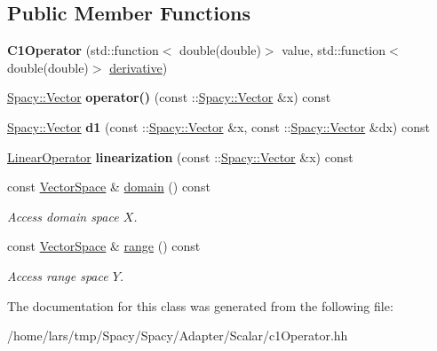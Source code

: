 \subsection*{Public Member Functions}
\begin{DoxyCompactItemize}
\item 
{\bfseries C1\+Operator} (std\+::function$<$ double(double)$>$ value, std\+::function$<$ double(double)$>$ \hyperlink{namespaceSpacy_a002fe344fa6d04a6ac59a74ea25fddb6}{derivative})\hypertarget{classSpacy_1_1Scalar_1_1C1Operator_a97f719a6349064072c892972663e70c7}{}\label{classSpacy_1_1Scalar_1_1C1Operator_a97f719a6349064072c892972663e70c7}

\item 
\hyperlink{classSpacy_1_1Vector}{Spacy\+::\+Vector} {\bfseries operator()} (const \+::\hyperlink{classSpacy_1_1Vector}{Spacy\+::\+Vector} \&x) const \hypertarget{classSpacy_1_1Scalar_1_1C1Operator_a9ab2d8a905a70dd848c984e532b50fed}{}\label{classSpacy_1_1Scalar_1_1C1Operator_a9ab2d8a905a70dd848c984e532b50fed}

\item 
\hyperlink{classSpacy_1_1Vector}{Spacy\+::\+Vector} {\bfseries d1} (const \+::\hyperlink{classSpacy_1_1Vector}{Spacy\+::\+Vector} \&x, const \+::\hyperlink{classSpacy_1_1Vector}{Spacy\+::\+Vector} \&dx) const \hypertarget{classSpacy_1_1Scalar_1_1C1Operator_a56908ac8a9cd1e959f15e3f71a00a01b}{}\label{classSpacy_1_1Scalar_1_1C1Operator_a56908ac8a9cd1e959f15e3f71a00a01b}

\item 
\hyperlink{structSpacy_1_1Scalar_1_1LinearOperator}{Linear\+Operator} {\bfseries linearization} (const \+::\hyperlink{classSpacy_1_1Vector}{Spacy\+::\+Vector} \&x) const \hypertarget{classSpacy_1_1Scalar_1_1C1Operator_acefccd4cac61750dad6053a963b10944}{}\label{classSpacy_1_1Scalar_1_1C1Operator_acefccd4cac61750dad6053a963b10944}

\item 
const \hyperlink{classSpacy_1_1VectorSpace}{Vector\+Space} \& \hyperlink{classSpacy_1_1OperatorBase_a2588f9b3e0188820c4c494e63293dc6f}{domain} () const \hypertarget{classSpacy_1_1OperatorBase_a2588f9b3e0188820c4c494e63293dc6f}{}\label{classSpacy_1_1OperatorBase_a2588f9b3e0188820c4c494e63293dc6f}

\begin{DoxyCompactList}\small\item\em Access domain space $X$. \end{DoxyCompactList}\item 
const \hyperlink{classSpacy_1_1VectorSpace}{Vector\+Space} \& \hyperlink{classSpacy_1_1OperatorBase_ab19d3b7a6f290b1079248f1e567e53d6}{range} () const \hypertarget{classSpacy_1_1OperatorBase_ab19d3b7a6f290b1079248f1e567e53d6}{}\label{classSpacy_1_1OperatorBase_ab19d3b7a6f290b1079248f1e567e53d6}

\begin{DoxyCompactList}\small\item\em Access range space $Y$. \end{DoxyCompactList}\end{DoxyCompactItemize}


The documentation for this class was generated from the following file\+:\begin{DoxyCompactItemize}
\item 
/home/lars/tmp/\+Spacy/\+Spacy/\+Adapter/\+Scalar/c1\+Operator.\+hh\end{DoxyCompactItemize}
